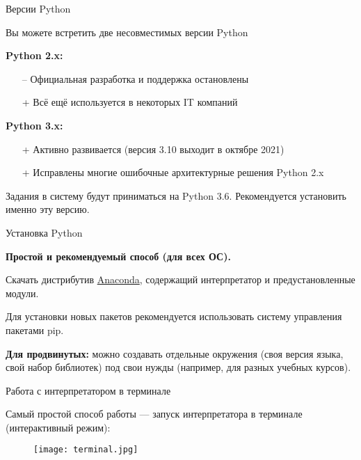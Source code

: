 \documentclass[11pt, fleqn, xcolor=x11names]{beamer}
\begin{document}
\begin{frame}{Версии Python}

{Вы можете встретить две несовместимых версии Python}

\hfill

\textbf{Python 2.x:}
\begin{itemize}
\item[--] Официальная разработка и поддержка остановлены 
\item[+] Всё ещё используется в некоторых IT компаний
\end{itemize}

\hfill

\textbf{Python 3.x:}
\begin{itemize}
\item[+] Активно развивается (версия 3.10 выходит в октябре 2021)
\item[+] Исправлены многие ошибочные архитектурные решения Python 2.x

\end{itemize}

\hfill

Задания в систему будут приниматься на Python 3.6. Рекомендуется установить именно эту версию.
\end{frame}

\begin{frame}{Установка Python}

\textbf{Простой и рекомендуемый способ (для всех ОС).}

Скачать дистрибутив \href{https://www.anaconda.com/download/}{Anaconda}, содержащий интерпретатор и предустановленные модули.

\hfill

Для установки новых пакетов рекомендуется использовать систему управления пакетами pip.

\hfill

\textbf{Для продвинутых:} можно создавать отдельные окружения (своя версия языка, свой набор библиотек) под свои нужды (например, для разных учебных курсов).

\end{frame}

\begin{frame}{Работа с интерпретатором в терминале}

Самый простой способ работы --- запуск интерпретатора в терминале (интерактивный режим):

\begin{figure}
\texttt{[image: terminal.jpg]}
\end{figure}

\end{frame}
\end{document}
